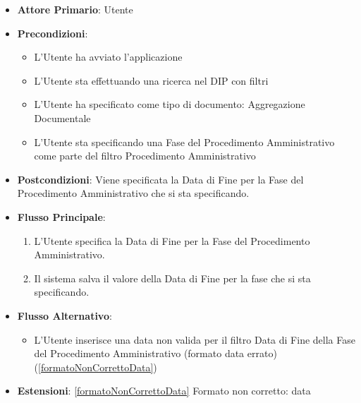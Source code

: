 \begin{itemize}
      \item \textbf{Attore Primario}: Utente
      \item \textbf{Precondizioni}: 
      \begin{itemize}
            \item L'Utente ha avviato l'applicazione
            \item L'Utente sta effettuando una ricerca nel DIP con filtri
            \item L'Utente ha specificato come tipo di documento: Aggregazione Documentale
            \item L'Utente sta specificando una Fase del Procedimento Amministrativo come parte del filtro Procedimento Amministrativo
      \end{itemize}
      \item \textbf{Postcondizioni}: Viene specificata la Data di Fine per la Fase del Procedimento Amministrativo che si sta specificando.
      \item \textbf{Flusso Principale}:
      \begin{enumerate}
            \item L'Utente specifica la Data di Fine per la Fase del Procedimento Amministrativo.
            \item Il sistema salva il valore della Data di Fine per la fase che si sta specificando.
      \end{enumerate}
      \item \textbf{Flusso Alternativo}:
      \begin{itemize}
            \item L'Utente inserisce una data non valida per il filtro Data di Fine della Fase del Procedimento Amministrativo (formato data errato) (\ref{formatoNonCorrettoData})
      \end{itemize}
      \item \textbf{Estensioni}: \ref{formatoNonCorrettoData} Formato non corretto: data
\end{itemize}

